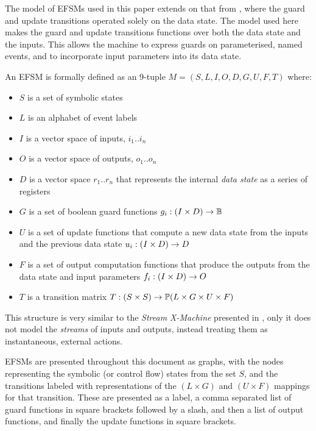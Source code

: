 The model of EFSMs used in this paper extends on that from \cite{EFSMs}, where the guard and update transitions operated solely on the data state. The model used here makes the guard and update transitions functions over both the data state and the inputs. This allows the machine to express guards on parameterised, named events, and to incorporate input parameters into its data state.
  
An EFSM is formally defined as an 9-tuple $M = (S,L,I,O,D,G,U,F,T)$ where:

\begin{itemize}
\item{$S$ is a set of symbolic states}
\item{$L$ is an alphabet of event labels}
\item{$I$ is a vector space of inputs, $i_{1} .. i_{n}$}
\item{$O$ is a vector space of outputs, $o_{1} .. o_{n}$}
\item{$D$ is a vector space $r_{1} .. r_{n}$ that represents the internal \emph{data state} as a series of registers}
\item{$G$ is a set of boolean guard functions $g_{i} : (I \times D) \rightarrow {\mathbb B}$}
\item{$U$ is a set of update functions that compute a new data state from the inputs and the previous data state $u_{i} : (I \times D) \rightarrow D$}
\item{$F$ is a set of output computation functions that produce the outputs from the data state and input parameters $f_{i} : (I \times D) \rightarrow O$}
\item{$T$ is a transition matrix $T : (S \times S) \rightarrow \mathbb P (L \times G \times U \times F)$}
\end{itemize}

This structure is very similar to the \emph{Stream X-Machine} presented in \cite{StreamXMachines}, only it does not model the \emph{streams} of inputs and outputs, instead treating them as instantaneous, external actions.

EFSMs are presented throughout this document as graphs, with the nodes representing the symbolic (or control flow) states from the set $S$, and the transitions labeled with representations of the $(L \times G)$ and $(U \times F)$ mappings for that transition. These are presented as a label, a comma separated list of guard functions in square brackets followed by a slash, and then a list of output functions, and finally the update functions in square brackets.


